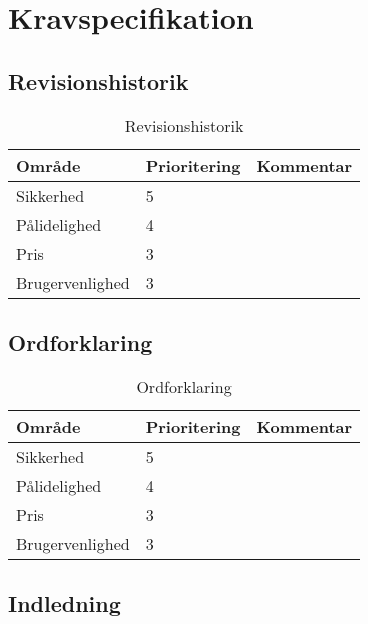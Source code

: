 \chapter{Kravspecifikation}

\section{Revisionshistorik}

\begin{table}[H]
	\centering
		\begin{tabular}{|l|l|p{7 cm}|} 
		\hline
			Område & Prioritering & Kommentar \\ \hline
			Sikkerhed & 5 & \\ \hline
			Pålidelighed & 4 & \\ \hline
			Pris & 3 & \\ \hline
			Brugervenlighed & 3 & \\ \hline
		\end{tabular}
	\caption{Revisionshistorik}
\end{table}

\section{Ordforklaring}


\begin{table}[H]
	\centering
		\begin{tabular}{|l|l|p{7 cm}|} 
		\hline
			Område & Prioritering & Kommentar \\ \hline
			Sikkerhed & 5 & \\ \hline
			Pålidelighed & 4 & \\ \hline
			Pris & 3 & \\ \hline
			Brugervenlighed & 3 & \\ \hline
		\end{tabular}
	\caption{Ordforklaring}
\end{table}


\newpage
\section{Indledning}
